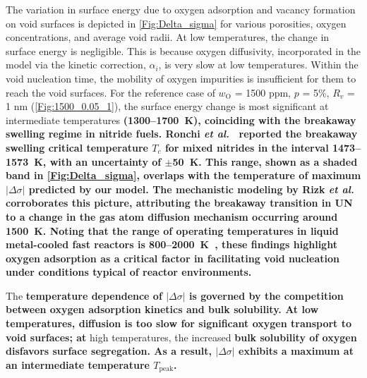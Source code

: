 \documentclass[preprint,12pt,sort&compress]{elsarticle}
\newcommand{\?}{\stackrel{?}{=}}
\providecommand{\DIFaddtex}[1]{{\bf #1}} %
\providecommand{\DIFdeltex}[1]{} %
\providecommand{\DIFaddbegin}{\protect\color{blue}} %
\providecommand{\DIFaddend}{\protect\color{black}} %
\providecommand{\DIFdelbegin}{\protect\color{red}} %
\providecommand{\DIFdelend}{\protect\color{black}} %
\providecommand{\DIFadd}[1]{\texorpdfstring{\DIFaddtex{#1}}{#1}} %
\providecommand{\DIFdel}[1]{\texorpdfstring{\DIFdeltex{#1}}{}} %
\newcommand{\DIFscaledelfig}{0.5}
\newlength{\DIFdelgraphicswidth} %
\newlength{\DIFdelgraphicsheight} %
\newcommand{\DIFaddincludegraphics}[2][]{{\color{blue}\fbox{\DIFOincludegraphics[#1]{#2}}}} %
\newcommand{\DIFdelincludegraphics}[2][]{%
\sbox{\DIFdelgraphicsbox}{\DIFOincludegraphics[#1]{#2}}%
\settoboxwidth{\DIFdelgraphicswidth}{\DIFdelgraphicsbox} %
\settoboxtotalheight{\DIFdelgraphicsheight}{\DIFdelgraphicsbox} %
\scalebox{\DIFscaledelfig}{%
\parbox[b]{\DIFdelgraphicswidth}{\usebox{\DIFdelgraphicsbox}\\[-\baselineskip] \rule{\DIFdelgraphicswidth}{0em}}\llap{\resizebox{\DIFdelgraphicswidth}{\DIFdelgraphicsheight}{%
\setlength{\unitlength}{\DIFdelgraphicswidth}%
\begin{picture}(1,1)%
\thicklines\linethickness{2pt} %
{\color[rgb]{1,0,0}\put(0,0){\framebox(1,1){}}}%
{\color[rgb]{1,0,0}\put(0,0){\line( 1,1){1}}}%
{\color[rgb]{1,0,0}\put(0,1){\line(1,-1){1}}}%
\end{picture}%
}\hspace*{3pt}}} %
} %
\DeclareRobustCommand{\DIFaddbegin}{\DIFOaddbegin \let\includegraphics\DIFaddincludegraphics} %
\DeclareRobustCommand{\DIFaddend}{\DIFOaddend \let\includegraphics\DIFOincludegraphics} %
\DeclareRobustCommand{\DIFdelbegin}{\DIFOdelbegin \let\includegraphics\DIFdelincludegraphics} %
\DeclareRobustCommand{\DIFdelend}{\DIFOaddend \let\includegraphics\DIFOincludegraphics} %
\begin{document}
\DIFdelend The variation in surface energy due to oxygen adsorption and vacancy formation on void surfaces is depicted in \cref{Fig:Delta_sigma} for various porosities, oxygen concentrations, and average void radii. At low temperatures, the change in surface energy is negligible. This is because oxygen diffusivity, incorporated in the model via the kinetic correction, $\alpha_i$, is very slow at low temperatures. Within the void nucleation time, the mobility of oxygen impurities is insufficient for them to reach the void surfaces. For the reference case of $w_\text{O}$ = 1500 ppm, $p$ = 5\%, $R_v$ = 1 nm (\cref{Fig:1500_0.05_1}), the surface energy change is most significant at intermediate temperatures \DIFdelbegin \DIFdel{, around 1500 K, where breakaway swelling in UN is predicted to start \cite{Rizk2025} .
}\DIFdelend \DIFaddbegin \DIFadd{(1300--1700~K), coinciding with the breakaway swelling regime in nitride fuels. Ronchi \textit{et al.}~\cite{Ronchi1978} reported the breakaway swelling critical temperature $T_c$ for mixed nitrides in the interval 1473--1573~K, with an uncertainty of $\pm$50~K. This range, shown as a shaded band in \cref{Fig:Delta_sigma}, overlaps with the temperature of maximum $|\Delta \sigma|$ predicted by our model. The mechanistic modeling by Rizk \textit{et al.}~\cite{Rizk2025} corroborates this picture, attributing the breakaway transition in UN to a change in the gas atom diffusion mechanism occurring around 1500~K. Noting that the range of operating temperatures in liquid metal-cooled fast reactors is 800--2000~K~\cite{Turos1990}, these findings highlight oxygen adsorption as a critical factor in facilitating void nucleation under conditions typical of reactor environments.
}\DIFaddend 

The \DIFdelbegin \DIFdel{oxygen effect on stabilizing voids is more significant at intermediate temperatures due to the balance between oxygen solubility and kinetics . At very }\DIFdelend \DIFaddbegin \DIFadd{temperature dependence of $|\Delta\sigma|$ is governed by the competition between oxygen adsorption kinetics and bulk solubility. At low temperatures, diffusion is too slow for significant oxygen transport to void surfaces; at }\DIFaddend high temperatures, the increased \DIFdelbegin \DIFdel{oxygen solubility in the bulk results in a preference for oxygen to remain in }\DIFdelend \DIFaddbegin \DIFadd{bulk solubility of oxygen disfavors surface segregation. As a result, $|\Delta\sigma|$ exhibits a maximum at an intermediate temperature $T_\text{peak}$.
}
\end{document}
